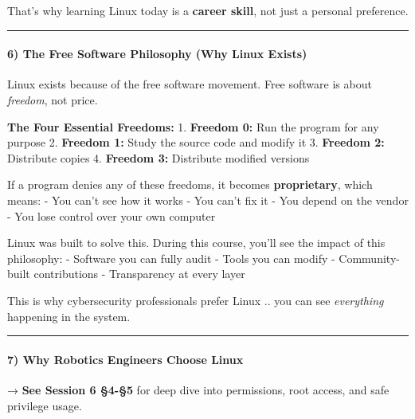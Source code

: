\documentclass[
  english,
  paper=a4,
  oneside  ,captions=tableheading
]{scrartcl}
\renewenvironment{quote}{\begin{customblockquote}\list{}{\rightmargin=0em\leftmargin=0em}%
\item\relax\color{blockquote-text}\ignorespaces}{\unskip\unskip\endlist\end{customblockquote}}
\begin{document}
That's why learning Linux today is a \textbf{career skill}, not just a
personal preference.

\begin{center}\rule{0.5\linewidth}{0.5pt}\end{center}

\paragraph{6) The Free Software Philosophy (Why Linux
Exists)}\label{the-free-software-philosophy-why-linux-exists}

Linux exists because of the free software movement. Free software is
about \emph{freedom}, not price.

\textbf{The Four Essential Freedoms:} 1. \textbf{Freedom 0:} Run the
program for any purpose 2. \textbf{Freedom 1:} Study the source code and
modify it 3. \textbf{Freedom 2:} Distribute copies 4. \textbf{Freedom
3:} Distribute modified versions

If a program denies any of these freedoms, it becomes
\textbf{proprietary}, which means: - You can't see how it works - You
can't fix it - You depend on the vendor - You lose control over your own
computer

Linux was built to solve this. During this course, you'll see the impact
of this philosophy: - Software you can fully audit - Tools you can
modify - Community-built contributions - Transparency at every layer

This is why cybersecurity professionals prefer Linux .. you can see
\emph{everything} happening in the system.

\begin{center}\rule{0.5\linewidth}{0.5pt}\end{center}

\paragraph{7) Why Robotics Engineers Choose
Linux}\label{why-robotics-engineers-choose-linux}

\begin{quote}
→ \textbf{See Session 6 §4-§5} for deep dive into permissions, root
access, and safe privilege usage.
\end{quote}
\end{document}
